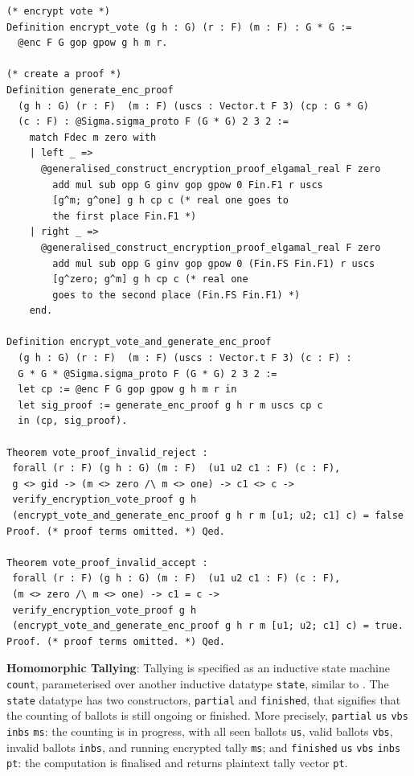 \documentclass[sigconf, anonymous]{acmart}
\begin{document}
\begin{lstlisting}[frame=single, language=Coq, caption={Frontend Functions},
  label={frontend_fun},captionpos=t, basicstyle=\ttfamily\footnotesize,
  abovecaptionskip=-\medskipamount]
(* encrypt vote *)
Definition encrypt_vote (g h : G) (r : F) (m : F) : G * G :=
  @enc F G gop gpow g h m r.

(* create a proof *)
Definition generate_enc_proof 
  (g h : G) (r : F)  (m : F) (uscs : Vector.t F 3) (cp : G * G) 
  (c : F) : @Sigma.sigma_proto F (G * G) 2 3 2 :=
    match Fdec m zero with 
    | left _ => 
      @generalised_construct_encryption_proof_elgamal_real F zero 
        add mul sub opp G ginv gop gpow 0 Fin.F1 r uscs 
        [g^m; g^one] g h cp c (* real one goes to 
        the first place Fin.F1 *)
    | right _ =>  
      @generalised_construct_encryption_proof_elgamal_real F zero 
        add mul sub opp G ginv gop gpow 0 (Fin.FS Fin.F1) r uscs 
        [g^zero; g^m] g h cp c (* real one 
        goes to the second place (Fin.FS Fin.F1) *)
    end.

Definition encrypt_vote_and_generate_enc_proof 
  (g h : G) (r : F)  (m : F) (uscs : Vector.t F 3) (c : F) : 
  G * G * @Sigma.sigma_proto F (G * G) 2 3 2 := 
  let cp := @enc F G gop gpow g h m r in
  let sig_proof := generate_enc_proof g h r m uscs cp c
  in (cp, sig_proof).

Theorem vote_proof_invalid_reject : 
 forall (r : F) (g h : G) (m : F)  (u1 u2 c1 : F) (c : F),
 g <> gid -> (m <> zero /\ m <> one) -> c1 <> c ->
 verify_encryption_vote_proof g h 
 (encrypt_vote_and_generate_enc_proof g h r m [u1; u2; c1] c) = false
Proof. (* proof terms omitted. *) Qed. 

Theorem vote_proof_invalid_accept :
 forall (r : F) (g h : G) (m : F)  (u1 u2 c1 : F) (c : F),
 (m <> zero /\ m <> one) -> c1 = c ->
 verify_encryption_vote_proof g h 
 (encrypt_vote_and_generate_enc_proof g h r m [u1; u2; c1] c) = true.
Proof. (* proof terms omitted. *) Qed.
\end{lstlisting}


\textbf{Homomorphic Tallying}: Tallying is specified as an inductive state machine \texttt{count}, parameterised 
over another inductive datatype \texttt{state}, similar to \cite{10.1007/978-3-319-66107-0_26}. The \texttt{state} datatype has two constructors, \texttt{partial} and \texttt{finished}, that signifies that the counting of ballots is still ongoing or finished. More precisely, \texttt{partial} \texttt{us} \texttt{vbs} \texttt{inbs} \texttt{ms}: the counting is in progress, with all seen ballots \texttt{us}, valid ballots \texttt{vbs}, invalid ballots \texttt{inbs}, and running encrypted tally \texttt{ms}; and \texttt{finished} \texttt{us} \texttt{vbs} \texttt{inbs} \texttt{pt}: the computation is finalised and returns plaintext tally vector \texttt{pt}.
\end{document}
